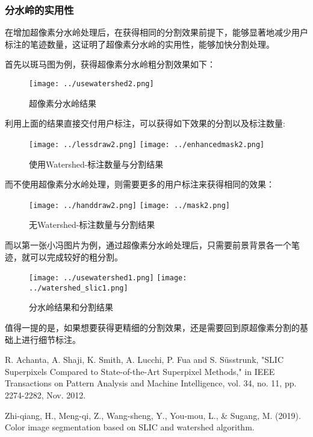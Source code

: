 \documentclass[UTF8]{ctexart}
\begin{document}
\subsubsection{分水岭的实用性}
在增加超像素分水岭处理后，在获得相同的分割效果前提下，能够显著地减少用户标注的笔迹数量，这证明了超像素分水岭的实用性，能够加快分割处理。

首先以斑马图为例，获得超像素分水岭粗分割效果如下：
\begin{figure}[H]
    \centering
    \texttt{[image: ../usewatershed2.png]}
    \caption{超像素分水岭结果}
\end{figure}

利用上面的结果直接交付用户标注，可以获得如下效果的分割以及标注数量:
\begin{figure}[H]
    \centering
    \texttt{[image: ../lessdraw2.png]}
    \texttt{[image: ../enhancedmask2.png]}
    \caption{使用Watershed-标注数量与分割结果}
\end{figure}

而不使用超像素分水岭处理，则需要更多的用户标注来获得相同的效果：
\begin{figure}[H]
    \centering
    \texttt{[image: ../handdraw2.png]}
    \texttt{[image: ../mask2.png]}
    \caption{无Watershed-标注数量与分割结果}
\end{figure}

而以第一张小冯图片为例，通过超像素分水岭处理后，只需要前景背景各一个笔迹，就可以完成较好的粗分割。
\begin{figure}[H]
    \centering
    \texttt{[image: ../usewatershed1.png]}
    \texttt{[image: ../watershed\_slic1.png]}
    \caption{分水岭结果和分割结果}
\end{figure}

值得一提的是，如果想要获得更精细的分割效果，还是需要回到原超像素分割的基础上进行细节标注。

\begin{thebibliography}{99}
    R. Achanta, A. Shaji, K. Smith, A. Lucchi, P. Fua and S. Süsstrunk, "SLIC Superpixels Compared to State-of-the-Art Superpixel Methods," in IEEE Transactions on Pattern Analysis and Machine Intelligence, vol. 34, no. 11, pp. 2274-2282, Nov. 2012.
    
    Zhi-qiang, H., Meng-qi, Z., Wang-sheng, Y., You-mou, L., \& Sugang, M. (2019). Color image segmentation based on SLIC and watershed algorithm.
\end{thebibliography}
\end{document}
